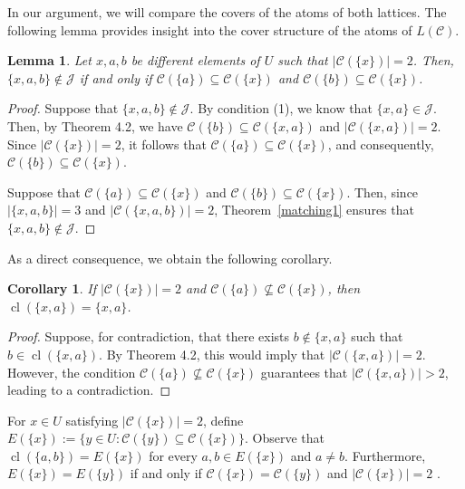 \documentclass{article}
\newtheorem{lemma}[theorem]{Lemma}
\newtheorem{corollary}[theorem]{Corollary}
\begin{document}
In our argument, we will compare the covers of the atoms of both lattices. The following lemma provides insight into the cover structure of the atoms of \( L(\mathcal{C}) \).

\begin{lemma}
Let \( x,a,b \) be different elements of $U$ such that \( |\mathcal{C}(\{x\})| = 2 \). Then, \( \{x,a,b\} \not\in \mathcal{J} \) if and only if \( \mathcal{C}(\{a\}) \subseteq \mathcal{C}(\{x\}) \) and \( \mathcal{C}(\{b\}) \subseteq \mathcal{C}(\{x\}) \).
\end{lemma}

\begin{proof}
 Suppose that \( \{x,a,b\} \not\in \mathcal{J} \). By condition (1), we know that \( \{x,a\} \in \mathcal{J} \). Then, by Theorem 4.2, we have \( \mathcal{C}(\{b\}) \subseteq \mathcal{C}(\{x,a\}) \) and \( |\mathcal{C}(\{x,a\})| = 2 \). Since \( |\mathcal{C}(\{x\})| = 2 \), it follows that \( \mathcal{C}(\{a\}) \subseteq \mathcal{C}(\{x\}) \), and consequently, \( \mathcal{C}(\{b\}) \subseteq \mathcal{C}(\{x\}) \).

 Suppose that \( \mathcal{C}(\{a\}) \subseteq \mathcal{C}(\{x\}) \) and \( \mathcal{C}(\{b\}) \subseteq \mathcal{C}(\{x\}) \). Then, since \( |\{x,a,b\}| = 3 \) and \( |\mathcal{C}(\{x,a,b\})| = 2 \), Theorem~\ref{matching1} ensures that \( \{x,a,b\} \not\in \mathcal{J} \).
\end{proof}

As a direct consequence, we obtain the following corollary.

\begin{corollary}
If \( |\mathcal{C}(\{x\})| = 2 \) and \( \mathcal{C}(\{a\}) \not\subseteq \mathcal{C}(\{x\}) \), then \( \operatorname{cl}(\{x,a\}) = \{x,a\} \).
\end{corollary}

\begin{proof}
Suppose, for contradiction, that there exists \( b \not\in \{x,a\} \) such that \( b \in \operatorname{cl}(\{x,a\}) \). By Theorem 4.2, this would imply that \( |\mathcal{C}(\{x,a\})| = 2 \). However, the condition \( \mathcal{C}(\{a\}) \not\subseteq \mathcal{C}(\{x\}) \) guarantees that \( |\mathcal{C}(\{x,a\})| > 2 \), leading to a contradiction.
\end{proof}

For \( x \in U \) satisfying \( |\mathcal{C}(\{x\})| = 2 \), define
$E(\{x\}) := \{y \in U : \mathcal{C}(\{y\}) \subseteq \mathcal{C}(\{x\})\}.$
Observe that \( \operatorname{cl}(\{a,b\}) = E(\{x\}) \) for every \( a,b \in E(\{x\}) \) and $a\neq b$. Furthermore, \( E(\{x\}) = E(\{y\}) \) if and only if \( \mathcal{C}(\{x\}) = \mathcal{C}(\{y\})\) and $|\mathcal{C}(\{x\})|=2$ .
\end{document}
